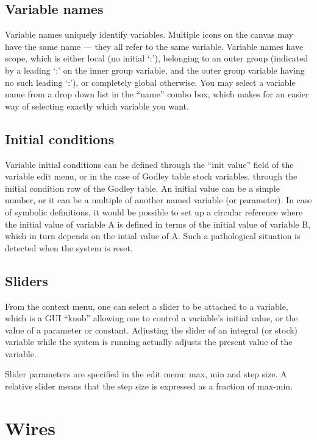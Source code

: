 \subsection{Variable names}

Variable names uniquely identify variables. Multiple icons on the
canvas may have the same name --- they all refer to the same
variable. Variable names have scope, which is either local (no initial
`:'), belonging to an outer group (indicated by a leading `:' on the
inner group variable, and the outer group variable having no such
leading `:'), or completely global otherwise. You may select a
variable name from a drop down list in the ``name'' combo box, which
makes for an easier way of selecting exactly which variable you want.

\subsection{Initial conditions}\label{var:init}

Variable initial conditions can be defined through the ``init value''
field of the variable edit menu, or in the case of Godley table stock
variables, through the initial condition row of the Godley table. An
initial value can be a simple number, or it can be a multiple of
another named variable (or parameter). In case of symbolic
definitions, it would be possible to set up a circular reference where
the initial value of variable A is defined in terms of the initial
value of variable B, which in turn depends on the intial value of
A. Such a pathological situation is detected when the system is reset.

\subsection{Sliders}

From the context menu, one can select a slider to be attached to a
variable, which is a GUI ``knob'' allowing one to control a variable's
initial value, or the value of a parameter or constant. Adjusting the
slider of an integral (or stock) variable while the system is running
actually adjusts the present value of the variable.

Slider parameters are specified in the edit menu: max, min and step
size. A relative slider means that the step size is expressed as a
fraction of max-min.

\section{Wires}

